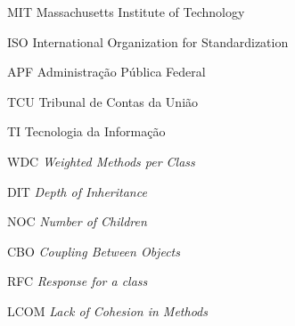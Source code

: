 \begin{siglas}
  \item[MIT] Massachusetts Institute of Technology 
 \item[ISO] International Organization for Standardization
 \item[APF] Administração Pública Federal
 \item[TCU] Tribunal de Contas da União
 \item[TI] Tecnologia da Informação
 \item[WDC] \textit{Weighted Methods per Class}
 \item[DIT] \textit{Depth of Inheritance}
 \item[NOC] \textit{Number of Children}
 \item[CBO] \textit{Coupling Between Objects}
 \item[RFC] \textit{Response for a class}
 \item[LCOM] \textit{Lack of Cohesion in Methods}
\end{siglas}
